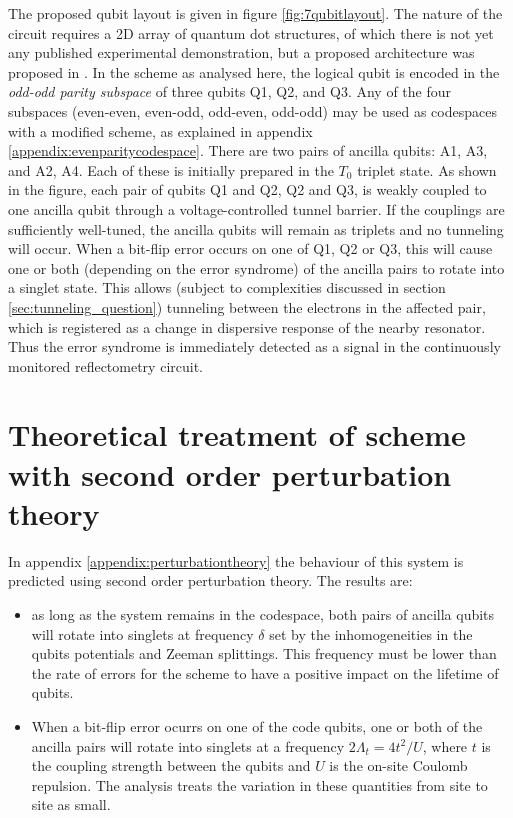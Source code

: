 \documentclass{report}
\begin{document}
The proposed qubit layout is given in figure \ref{fig:7qubitlayout}. The nature of the circuit requires a 2D array of quantum dot structures, of which there is not yet any published experimental demonstration, but a proposed architecture was proposed in \cite{Tadokoro2021}. In the scheme as analysed here, the logical qubit is encoded in the \textit{odd-odd parity subspace} of three qubits Q1, Q2, and Q3. Any of the four subspaces (even-even, even-odd, odd-even, odd-odd) may be used as codespaces with a modified scheme, as explained in appendix \ref{appendix:evenparitycodespace}. There are two pairs of ancilla qubits: A1, A3, and A2, A4. Each of these is initially prepared in the $T_0$ triplet state. As shown in the figure, each pair of qubits Q1 and Q2, Q2 and Q3, is weakly coupled to one ancilla qubit through a voltage-controlled tunnel barrier. If the couplings are sufficiently well-tuned, the ancilla qubits will remain as triplets and no tunneling will occur. When a bit-flip error occurs on one of Q1, Q2 or Q3, this will cause one or both (depending on the error syndrome) of the ancilla pairs to rotate into a singlet state. This allows (subject to complexities discussed in section \ref{sec:tunneling_question}) tunneling between the electrons in the affected pair, which is registered as a change in dispersive response of the nearby resonator. Thus the error syndrome is immediately detected as a signal in the continuously monitored reflectometry circuit.

\section{Theoretical treatment of scheme with second order perturbation theory}
 In appendix \ref{appendix:perturbationtheory} the behaviour of this system is predicted using second order perturbation theory. The results are:
 \begin{itemize}
    \item as long as the system remains in the codespace, both pairs of ancilla qubits will rotate into singlets at frequency $\delta$ set by the inhomogeneities in the qubits potentials and Zeeman splittings. This frequency must be lower than the rate of errors for the scheme to have a positive impact on the lifetime of qubits.
    \item  When a bit-flip error ocurrs on one of the code qubits, one or both of the ancilla pairs will rotate into singlets at a frequency $2\Lambda_t = 4t^2/U$, where $t$ is the coupling strength between the qubits and $U$ is the on-site Coulomb repulsion. The analysis treats the variation in these quantities from site to site as small.
 \end{itemize}
\end{document}
